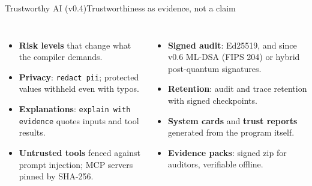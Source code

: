 \documentclass[aspectratio=169,10pt]{beamer}
\begin{document}
\begin{frame}{Trustworthy AI (v0.4)}{Trustworthiness as evidence, not a claim}
\begin{columns}[T]
\begin{itemize}\setlength\itemsep{5pt}
\item \textbf{Risk levels} that change what the compiler demands.
\item \textbf{Privacy}: \texttt{redact pii}; protected values withheld even with typos.
\item \textbf{Explanations}: \texttt{explain with evidence} quotes inputs and tool results.
\item \textbf{Untrusted tools} fenced against prompt injection; MCP servers pinned by SHA-256.
\end{itemize}
\begin{itemize}\setlength\itemsep{5pt}
\item \textbf{Signed audit}: Ed25519, and since v0.6 ML-DSA (FIPS 204) or hybrid post-quantum signatures.
\item \textbf{Retention}: audit and trace retention with signed checkpoints.
\item \textbf{System cards} and \textbf{trust reports} generated from the program itself.
\item \textbf{Evidence packs}: signed zip for auditors, verifiable offline.
\end{itemize}
\end{columns}
\end{frame}
\end{document}
